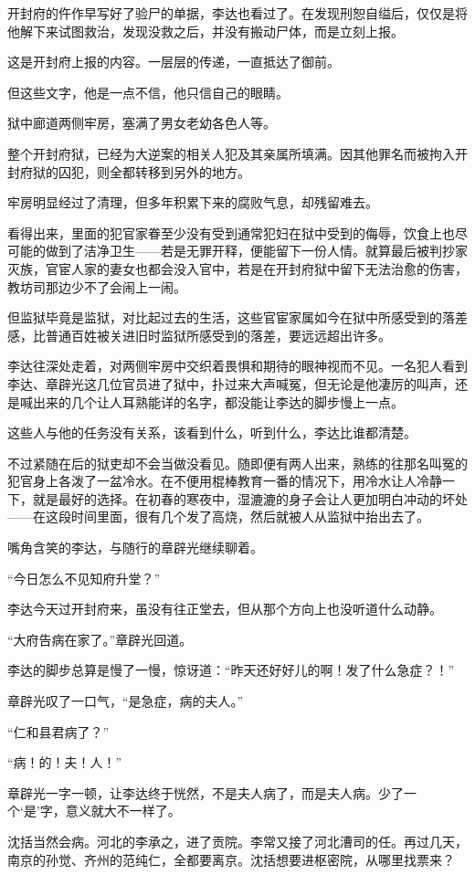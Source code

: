 开封府的仵作早写好了验尸的单据，李达也看过了。在发现刑恕自缢后，仅仅是将他解下来试图救治，发现没救之后，并没有搬动尸体，而是立刻上报。

这是开封府上报的内容。一层层的传递，一直抵达了御前。

但这些文字，他是一点不信，他只信自己的眼睛。

狱中廊道两侧牢房，塞满了男女老幼各色人等。

整个开封府狱，已经为大逆案的相关人犯及其亲属所填满。因其他罪名而被拘入开封府狱的囚犯，则全都转移到另外的地方。

牢房明显经过了清理，但多年积累下来的腐败气息，却残留难去。

看得出来，里面的犯官家眷至少没有受到通常犯妇在狱中受到的侮辱，饮食上也尽可能的做到了洁净卫生——若是无罪开释，便能留下一份人情。就算最后被判抄家灭族，官宦人家的妻女也都会没入官中，若是在开封府狱中留下无法治愈的伤害，教坊司那边少不了会闹上一闹。

但监狱毕竟是监狱，对比起过去的生活，这些官宦家属如今在狱中所感受到的落差感，比普通百姓被关进旧时监狱所感受到的落差，要远远超出许多。

李达往深处走着，对两侧牢房中交织着畏惧和期待的眼神视而不见。一名犯人看到李达、章辟光这几位官员进了狱中，扑过来大声喊冤，但无论是他凄厉的叫声，还是喊出来的几个让人耳熟能详的名字，都没能让李达的脚步慢上一点。

这些人与他的任务没有关系，该看到什么，听到什么，李达比谁都清楚。

不过紧随在后的狱吏却不会当做没看见。随即便有两人出来，熟练的往那名叫冤的犯官身上各泼了一盆冷水。在不便用棍棒教育一番的情况下，用冷水让人冷静一下，就是最好的选择。在初春的寒夜中，湿漉漉的身子会让人更加明白冲动的坏处——在这段时间里面，很有几个发了高烧，然后就被人从监狱中抬出去了。

嘴角含笑的李达，与随行的章辟光继续聊着。

“今日怎么不见知府升堂？”

李达今天过开封府来，虽没有往正堂去，但从那个方向上也没听道什么动静。

“大府告病在家了。”章辟光回道。

李达的脚步总算是慢了一慢，惊讶道：“昨天还好好儿的啊！发了什么急症？！”

章辟光叹了一口气，“是急症，病的夫人。”

“仁和县君病了？”

“病！的！夫！人！”

章辟光一字一顿，让李达终于恍然，不是夫人病了，而是夫人病。少了一个‘是’字，意义就大不一样了。

沈括当然会病。河北的李承之，进了贡院。李常又接了河北漕司的任。再过几天，南京的孙觉、齐州的范纯仁，全都要离京。沈括想要进枢密院，从哪里找票来？

